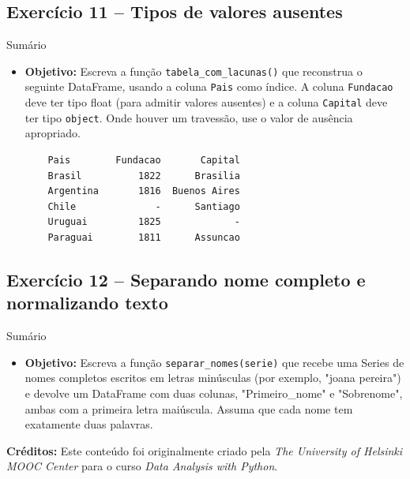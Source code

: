 \documentclass[11pt,a4paper]{article}
\begin{document}
\subsection*{Exercício 11 -- Tipos de valores ausentes}
\begin{exercicio}{Sumário}
\begin{itemize}
    \item \textbf{Objetivo:} Escreva a função \texttt{tabela\_com\_lacunas()} que reconstrua o seguinte DataFrame, usando a coluna \texttt{Pais} como índice. A coluna \texttt{Fundacao} deve ter tipo float (para admitir valores ausentes) e a coluna \texttt{Capital} deve ter tipo \texttt{object}. Onde houver um travessão, use o valor de ausência apropriado.
    \begin{verbatim}
    Pais        Fundacao       Capital
    Brasil          1822      Brasilia
    Argentina       1816  Buenos Aires
    Chile              -      Santiago
    Uruguai         1825             -
    Paraguai        1811      Assuncao
    \end{verbatim}
\end{itemize}
\end{exercicio}

\subsection*{Exercício 12 -- Separando nome completo e normalizando texto}
\begin{exercicio}{Sumário}
\begin{itemize}
    \item \textbf{Objetivo:} Escreva a função \texttt{separar\_nomes(serie)} que recebe uma Series de nomes completos escritos em letras minúsculas (por exemplo, "joana pereira") e devolve um DataFrame com duas colunas, "Primeiro\_nome" e "Sobrenome", ambas com a primeira letra maiúscula. Assuma que cada nome tem exatamente duas palavras.
\end{itemize}
\end{exercicio}

\vspace{2em}
\noindent\textbf{Créditos:} Este conteúdo foi originalmente criado pela \textit{The University of Helsinki MOOC Center} para o curso \textit{Data Analysis with Python}.
\end{document}
